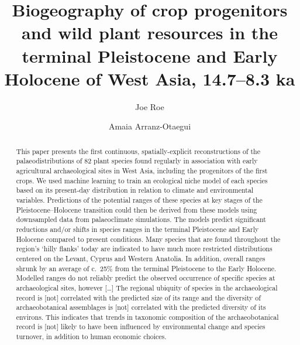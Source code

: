 \documentclass[
  authoryear,
  preprint]{elsarticle}
\begin{document}
\begin{frontmatter}
\title{Biogeography of crop progenitors and wild plant resources in the
terminal Pleistocene and Early Holocene of West Asia, 14.7--8.3 ka}
\author[1,2]{Joe Roe%
%
}
\author[3]{Amaia Arranz-Otaegui%
%
}





        
\begin{abstract}
This paper presents the first continuous, spatially-explicit
reconstructions of the palaeodistributions of 82 plant species found
regularly in association with early agricultural archaeological sites in
West Asia, including the progenitors of the first crops. We used machine
learning to train an ecological niche model of each species based on its
present-day distribution in relation to climate and environmental
variables. Predictions of the potential ranges of these species at key
stages of the Pleistocene--Holocene transition could then be derived
from these models using downsampled data from palaeoclimate simulations.
The models predict significant reductions and/or shifts in species
ranges in the terminal Pleistocene and Early Holocene compared to
present conditions. Many species that are found throughout the region's
`hilly flanks' today are indicated to have much more restricted
distributions centered on the Levant, Cyprus and Western Anatolia. In
addition, overall ranges shrunk by an average of c.~25\% from the
terminal Pleistocene to the Early Holocene. Modelled ranges do not
reliably predict the observed occurrence of specific species at
archaeological sites, however {[}\ldots{]} The regional ubiquity of
species in the archaeological record is {[}not{]} correlated with the
predicted size of its range and the diversity of archaeobotanical
assemblages is {[}not{]} correlated with the predicted diversity of its
environs. This indicates that trends in taxonomic composition of the
archaeobotanical record is {[}not{]} likely to have been influenced by
environmental change and species turnover, in addition to human economic
choices.
\end{abstract}





\end{frontmatter}
    
\end{document}
